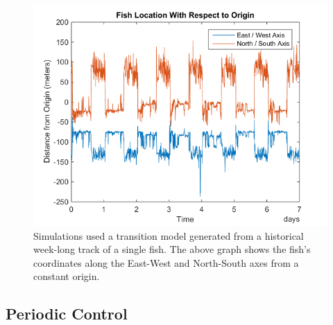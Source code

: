 \documentclass[11pt,letterpaper]{article}
\begin{document}
	\begin{figure}
		\centering
		\includegraphics[width = 0.7\linewidth]{results/location}
		\caption{Simulations used a transition model generated from a historical week-long track of a single fish. The above graph shows the fish's coordinates along the East-West and North-South axes from a constant origin.}
		\label{fig:periodicFish}
	\end{figure}
	
	\subsection{Periodic Control}
	
\end{document}
